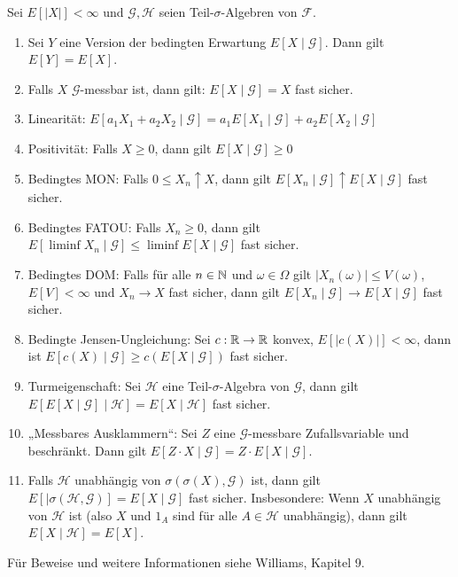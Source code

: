\documentclass[a4paper,twoside,DIV15,BCOR12mm]{scrbook}
\newcommand{\cF}{\mathcal F}
\begin{document}
\begin{bemerkung}
Sei $E[|X|]<\infty$ und $\mathcal G, \mathcal H$ seien Teil-$\sigma$-Algebren von $\cF$.
\begin{enumerate}
\item Sei $Y$ eine Version der bedingten Erwartung $E[X\mid \mathcal G]$. Dann gilt $E[Y]=E[X]$.
\item Falls $X$ $\mathcal G$-messbar ist, dann gilt: $E[X\mid \mathcal G]=X$ fast sicher.
\item Linearität: $E[a_1 X_1 + a_2 X_2\mid \mathcal G] = a_1 E[X_1\mid \mathcal G] + a_2 E[X_2 \mid \mathcal G]$
\item Positivität: Falls $X\ge 0$, dann gilt $E[X\mid \mathcal G] \ge 0$
\item Bedingtes MON: Falls $0 \le X_n \uparrow X$, dann gilt $E[X_n \mid \mathcal G] \uparrow E[X \mid \mathcal G]$ fast sicher.
\item Bedingtes FATOU: Falls $X_n\ge 0$, dann gilt $E[\liminf X_n \mid\mathcal G] \le \liminf E[X \mid \mathcal G]$ fast sicher.
\item Bedingtes DOM: Falls für alle $n\in\mathbb{N}$ und $\omega\in\Omega$ gilt $|X_n(\omega) |\le V(\omega)$, $E[V]<\infty$ und $X_n\to X$ fast sicher, dann gilt $E[X_n\mid \mathcal G] \to E[X\mid\mathcal G]$ fast sicher.
\item Bedingte Jensen-Ungleichung: Sei $c:\mathbb{R}\to\mathbb{R}$ konvex, $E[|c(X)|]<\infty$, dann ist $E[c(X)\mid\mathcal G] \ge c(E[X\mid \mathcal G])$ fast sicher.
\item Turmeigenschaft: Sei $\mathcal H$ eine Teil-$\sigma$-Algebra von $\mathcal G$, dann gilt $E[E[X\mid\mathcal G]\mid\mathcal H] = E[X\mid\mathcal H]$ fast sicher.
\item „Messbares Ausklammern“: Sei $Z$ eine $\mathcal G$-messbare Zufallsvariable und beschränkt. Dann gilt $E[Z\cdot X\mid \mathcal G] = Z\cdot E[X\mid \mathcal G]$.
\item Falls $\mathcal H$ unabhängig von $\sigma( \sigma(X), \mathcal G)$ ist, dann gilt $E[\mid \sigma(\mathcal H, \mathcal G)] = E[X\mid \mathcal G]$ fast sicher. Insbesondere: Wenn $X$ unabhängig von $\mathcal H$ ist (also $X$ und $1_A$ sind für alle $A\in\mathcal H$ unabhängig), dann gilt $E[X\mid \mathcal H] = E[X]$.
\end{enumerate}
\end{bemerkung}

Für Beweise und weitere Informationen siehe Williams, Kapitel 9.
\end{document}

